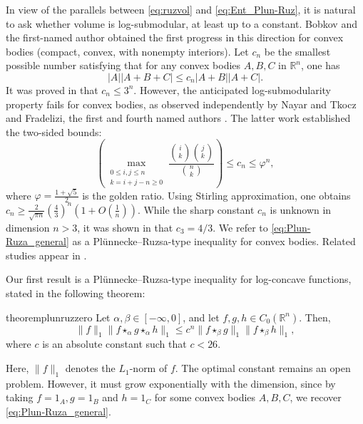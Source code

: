 \documentclass[11pt]{amsart}
\newcommand{\R}{{\mathbb R}}
\theoremstyle{plain}
\theoremstyle{definition}
\theoremstyle{remark}
\begin{document}
In view of the parallels between \eqref{eq:ruzvol} and \eqref{eq:Ent_Plun-Ruz}, it is natural to ask whether volume is log-submodular, at least up to a constant. Bobkov and the first-named author \cite{BM-12} obtained the first progress in this direction for convex bodies (compact, convex, with nonempty interiors). Let $c_n$ be the smallest possible number satisfying that for any convex bodies $A,B,C$ in $\R^n$, one has
\begin{equation}
    \label{eq:Plun-Ruza_general}
    |A| |A+B+C| \leq c_n |A+B| |A+C|.
\end{equation}
It was proved in \cite{BM-12} that $c_n \leq 3^n$. However, the anticipated log-submodularity property fails for convex bodies, as observed independently by Nayar and Tkocz \cite{NT-17} and Fradelizi, the first and fourth named authors \cite{FMZ-24}. The latter work established the two-sided bounds:
\begin{equation}
    \label{Ineq_Plun-Ruz-sharper}
    \left(\max_{\substack{0\leq i,j\leq n\\k=i+j-n\geq 0}} \frac{\binom{i}{k}\binom{j}{k}}{\binom{n}{k}} \right) \leq c_n \leq \varphi^n,
\end{equation}
where $\varphi = \frac{1+\sqrt{5}}{2}$ is the golden ratio. Using Stirling approximation, one obtains $c_n \geq \frac{2}{\sqrt{\pi n}}\left(\frac{4}{3}\right)^n\left(1+ O(\frac{1}{n})\right)$. While the sharp constant $c_n$ is unknown in dimension $n > 3$, it was shown in \cite{FMZ-24} that $c_3=4/3$. We refer to \eqref{eq:Plun-Ruza_general} as a Pl\"unnecke--Ruzsa-type inequality for convex bodies.
Related studies appear in \cite{FMMZ-24,FHNMZ-26,FHNMZ-26-2,MNZ-24,FMZ-24,N-25}.


Our first result is a Pl\"unnecke--Ruzsa-type inequality for log-concave functions, stated in the following theorem:




\begin{restatable}{theorem}{plunruzzero}
\label{thm: Plu-Ruz-0}
Let $\alpha, \beta \in [-\infty, 0]$, and let $ f,g,h \in C_0 (\R^n)$. Then,
    \begin{equation}\label{eq:Plu-Ruz-0}
        \|f\|_1 \|f \star_\alpha g \star_\alpha h\|_1 \leq c^n \|f \star_\beta g \|_1\|f  \star_\beta h\|_1,
    \end{equation}
    where $c$ is an absolute constant such that $c < 26.$
\end{restatable}
\noindent
Here, $\|f\|_1$ denotes the $L_1$-norm of $f$. The optimal constant remains an open problem. However, it must grow exponentially with the dimension, since by taking $f =1_A, g= 1_B$ and $h =1_C$ for some convex bodies $A,B,C$, we recover \eqref{eq:Plun-Ruza_general}.
\end{document}
